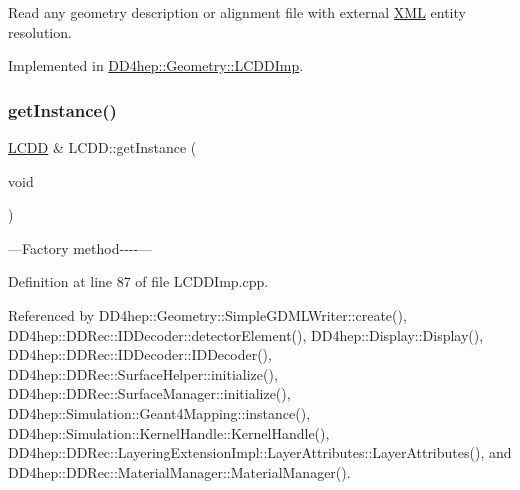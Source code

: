 Read any geometry description or alignment file with external \hyperlink{namespace_d_d4hep_1_1_x_m_l}{X\+ML} entity resolution. 



Implemented in \hyperlink{class_d_d4hep_1_1_geometry_1_1_l_c_d_d_imp_ae1c435032cd33235cd6405ca8d8aae9b}{D\+D4hep\+::\+Geometry\+::\+L\+C\+D\+D\+Imp}.

\hypertarget{class_d_d4hep_1_1_geometry_1_1_l_c_d_d_a4ba28eb0e53e15856d7a773c4ff758b9}{}\label{class_d_d4hep_1_1_geometry_1_1_l_c_d_d_a4ba28eb0e53e15856d7a773c4ff758b9} 
\subsubsection{\texorpdfstring{get\+Instance()}{getInstance()}}
{\footnotesize\ttfamily \hyperlink{class_d_d4hep_1_1_geometry_1_1_l_c_d_d}{L\+C\+DD} \& L\+C\+D\+D\+::get\+Instance (\begin{DoxyParamCaption}\item[{void}]{ }\end{DoxyParamCaption})\hspace{0.3cm}{\ttfamily [static]}}



---Factory method-\/-\/-\/-\/--- 



Definition at line 87 of file L\+C\+D\+D\+Imp.\+cpp.



Referenced by D\+D4hep\+::\+Geometry\+::\+Simple\+G\+D\+M\+L\+Writer\+::create(), D\+D4hep\+::\+D\+D\+Rec\+::\+I\+D\+Decoder\+::detector\+Element(), D\+D4hep\+::\+Display\+::\+Display(), D\+D4hep\+::\+D\+D\+Rec\+::\+I\+D\+Decoder\+::\+I\+D\+Decoder(), D\+D4hep\+::\+D\+D\+Rec\+::\+Surface\+Helper\+::initialize(), D\+D4hep\+::\+D\+D\+Rec\+::\+Surface\+Manager\+::initialize(), D\+D4hep\+::\+Simulation\+::\+Geant4\+Mapping\+::instance(), D\+D4hep\+::\+Simulation\+::\+Kernel\+Handle\+::\+Kernel\+Handle(), D\+D4hep\+::\+D\+D\+Rec\+::\+Layering\+Extension\+Impl\+::\+Layer\+Attributes\+::\+Layer\+Attributes(), and D\+D4hep\+::\+D\+D\+Rec\+::\+Material\+Manager\+::\+Material\+Manager().

\hypertarget{class_d_d4hep_1_1_geometry_1_1_l_c_d_d_ad09f49fc86a5b286ae55901e2b169d7c}{}\label{class_d_d4hep_1_1_geometry_1_1_l_c_d_d_ad09f49fc86a5b286ae55901e2b169d7c} 
